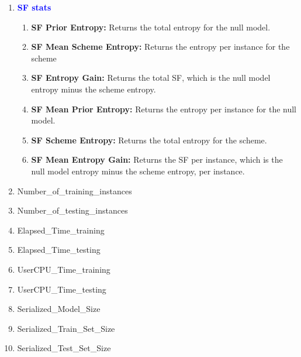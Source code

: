 \documentclass[a4paper,12pt, english]{article}
\begin{document}
\begin{enumerate}
\item \textbf{\textcolor{blue}{SF stats}}
\begin{enumerate}
\item \textbf{SF Prior Entropy: }
          Returns the total entropy for the null model.

\item \textbf{SF Mean Scheme Entropy: }
          Returns the entropy per instance for the scheme                  
              
\item \textbf{SF Entropy Gain:}
          Returns the total SF, which is the null model entropy minus the scheme entropy.    
          
\item \textbf{SF Mean Prior Entropy: }
          Returns the entropy per instance for the null model.       
          
\item \textbf{SF Scheme Entropy: }
          Returns the total entropy for the scheme. 

\item \textbf{SF Mean Entropy Gain: }
          Returns the SF per instance, which is the null model entropy minus the scheme entropy, per instance.         
         

\end{enumerate}

                
\item Number\_of\_training\_instances

\item Number\_of\_testing\_instances          

\item Elapsed\_Time\_training

\item Elapsed\_Time\_testing

\item UserCPU\_Time\_training

\item UserCPU\_Time\_testing
    
\item Serialized\_Model\_Size

\item Serialized\_Train\_Set\_Size

\item Serialized\_Test\_Set\_Size
	    
\end{enumerate}
\end{document}
